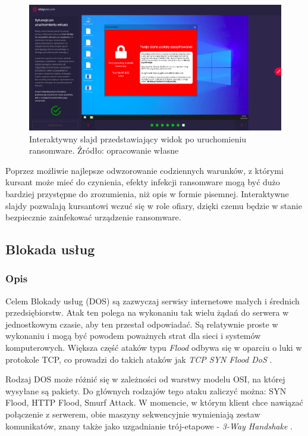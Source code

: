 \documentclass[12pt,twoside]{article}
\begin{document}
\begin{figure}[H]
	\centering
	\includegraphics[width=0.98\linewidth]{figures/ransomware-slide-screenshot4}
	\caption{Interaktywny slajd przedstawiający widok po uruchomieniu ransomware. Źródło: opracowanie własne}
\end{figure}

Poprzez możliwie najlepsze odwzorowanie codziennych warunków, z którymi kursant może mieć do czynienia, efekty infekcji ransomware mogą być dużo bardziej przystępne do zrozumienia, niż opis w formie pisemnej. Interaktywne slajdy pozwalają kursantowi wczuć się w role ofiary, dzięki czemu będzie w stanie bezpiecznie zainfekować urządzenie ransomware. 

\clearpage
\subsection{Blokada usług}
\subsubsection{Opis}
Celem Blokady usług (DOS) są zazwyczaj serwisy internetowe małych i średnich przedsiębiorstw. Atak ten polega na wykonaniu tak wielu żądań do serwera w jednostkowym czasie, aby ten przestał odpowiadać. Są relatywnie proste w wykonaniu i mogą być powodem poważnych strat dla sieci i systemów komputerowych. Większa część ataków typu \emph{Flood} odbywa się w oparciu o luki w protokole TCP, co prowadzi do takich ataków jak \emph{TCP SYN Flood DoS} \cite{Ddos}.

Rodzaj DOS może różnić się w zależności od warstwy modelu OSI, na której wysyłane są pakiety. Do głównych rodzajów tego ataku zaliczyć można: SYN Flood, HTTP Flood, Smurf Attack. W momencie, w którym klient chce nawiązać połączenie z serwerem, obie maszyny sekwencyjnie wymieniają zestaw komunikatów, znany także jako uzgadnianie trój-etapowe - \emph{3-Way Handshake} \cite{3WayHandshake}. 
\end{document}
